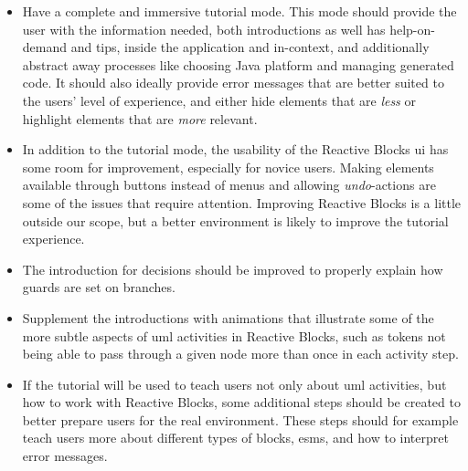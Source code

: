 \begin{itemize}
	\item Have a complete and immersive tutorial mode. This mode should provide the user with the information needed, both introductions as well has help-on-demand and tips, inside the application and in-context, and additionally abstract away processes like choosing Java platform and managing generated code. It should also ideally provide error messages that are better suited to the users' level of experience, and either hide elements that are \emph{less} or highlight elements that are \emph{more} relevant.
	\item In addition to the tutorial mode, the usability of the Reactive Blocks \gls{ui} has some room for improvement, especially for novice users. Making elements available through buttons instead of menus and allowing \emph{undo}-actions are some of the issues that require attention. Improving Reactive Blocks is a little outside our scope, but a better environment is likely to improve the tutorial experience.
	\item The introduction for decisions should be improved to properly explain how guards are set on branches.
	\item Supplement the introductions with animations that illustrate some of the more subtle aspects of \gls{uml} activities in Reactive Blocks, such as tokens not being able to pass through a given node more than once in each activity step.
	\item If the tutorial will be used to teach users not only about \gls{uml} activities, but how to work with Reactive Blocks, some additional steps should be created to better prepare users for the real environment. These steps should for example teach users more about different types of blocks, \glspl{esm}, and how to interpret error messages.
\end{itemize}


